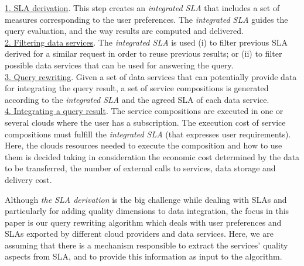 \noindent \underline{1. SLA derivation}. This step creates an \textsl{integrated
SLA} that includes a set of measures corresponding to the user preferences. The \textsl{integrated SLA} guides the query evaluation, and the way results are computed and delivered. \\
\underline{2. Filtering data services}. The \textsl{integrated SLA} is used (i)
to filter previous SLA derived for a similar request in order to reuse previous results; or (ii) to filter possible data services that can be used for answering the query. \\
\underline{3. Query rewriting}. Given a set of data services that can
potentially provide data for integrating the query result, a set of service compositions is generated according to the \textsl{integrated SLA} and the agreed SLA of each data service. \\
\underline{4. Integrating a query result}. The service compositions are executed
in one or several clouds where the user has a subscription. The execution cost of service compositions must fulfill the \textsl{integrated SLA} (that expresses user requirements). Here, the clouds resources needed to execute the composition and how to use them is decided taking in consideration the economic cost determined by the data to be transferred, the number of external calls to services, data storage and delivery cost.
\bigskip

Although \textit{the SLA derivation} is the big challenge while dealing with
SLAs and particularly for adding quality dimensions to data integration, the
focus in this paper is our query rewriting algorithm which deals with user
preferences and SLAs exported by different cloud providers and data services.
Here, we are assuming that there is a mechanism responsible to extract the
services' quality aspects from SLA, and to provide this information as input to
the algorithm. 



